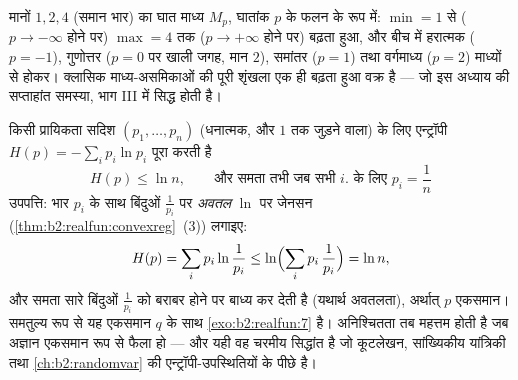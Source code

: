\begin{omfigure}

{\small मानों $1, 2, 4$ (समान भार) का घात माध्य $M_p$, घातांक $p$ के फलन के रूप
में: $\min = 1$ से ($p \to -\infty$ होने पर) $\max = 4$ तक ($p \to
+\infty$ होने पर) बढ़ता हुआ, और बीच में
हरात्मक ($p = -1$), गुणोत्तर ($p = 0$ पर खाली जगह, मान $2$), समांतर ($p = 1$) तथा
वर्गमाध्य ($p
= 2$) माध्यों से होकर। क्लासिक माध्य-असमिकाओं की पूरी शृंखला
एक ही बढ़ता हुआ वक्र है --- जो इस अध्याय की सप्ताहांत समस्या, भाग III में
सिद्ध होती है।}
\end{omfigure}

\begin{example}[महत्तम एन्ट्रॉपी]\label{ex:b2:realfun:entropy}
किसी प्रायिकता सदिश $(p_1, \dots, p_n)$ (धनात्मक, और $1$ तक जुड़ने वाला) के लिए
एन्ट्रॉपी $H(p) = -\sum_i p_i\ln p_i$ पूरा करती है
\[
H(p) \leq \ln n ,
\qquad\text{और समता तभी जब सभी }
i .
\text{ के लिए } p_i = \frac1n \]
उपपत्ति: भार $p_i$ के साथ बिंदुओं $\frac{1}{p_i}$ पर \emph{अवतल} $\ln$ पर जेनसन
(\cref{thm:b2:realfun:convexreg}~(3)) लगाइए:
\[
H(p) = \sum_i p_i\ln\frac{1}{p_i}
\leq \ln\Bigl(\sum_i p_i\,\frac1{p_i}\Bigr) = \ln n ,
\]
और समता सारे बिंदुओं $\frac1{p_i}$ को बराबर होने पर बाध्य कर देती है (यथार्थ
अवतलता), अर्थात् $p$ एकसमान। समतुल्य रूप से यह एकसमान $q$ के साथ \cref{exo:b2:realfun:7}
है। अनिश्चितता तब महत्तम होती है जब अज्ञान एकसमान रूप से फैला हो --- और
यही वह चरमीय सिद्धांत है जो कूटलेखन, सांख्यिकीय यांत्रिकी तथा \cref{ch:b2:randomvar} की
एन्ट्रॉपी-उपस्थितियों के पीछे है।
\end{example}

